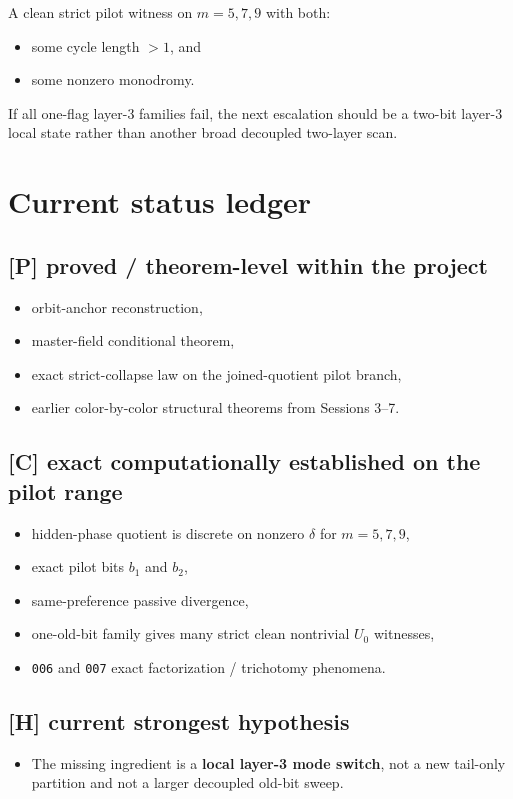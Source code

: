 \documentclass[11pt]{article}
\begin{document}
A clean strict pilot witness on $m=5,7,9$ with both:
\begin{itemize}
    \item some cycle length $>1$, and
    \item some nonzero monodromy.
\end{itemize}

If all one-flag layer-3 families fail, the next escalation should be a two-bit layer-3 local state rather than another broad decoupled two-layer scan.

\section*{Current status ledger}

\subsection*{[P] proved / theorem-level within the project}
\begin{itemize}
    \item orbit-anchor reconstruction,
    \item master-field conditional theorem,
    \item exact strict-collapse law on the joined-quotient pilot branch,
    \item earlier color-by-color structural theorems from Sessions 3--7.
\end{itemize}

\subsection*{[C] exact computationally established on the pilot range}
\begin{itemize}
    \item hidden-phase quotient is discrete on nonzero $\delta$ for $m=5,7,9$,
    \item exact pilot bits $b_1$ and $b_2$,
    \item same-preference passive divergence,
    \item one-old-bit family gives many strict clean nontrivial $U_0$ witnesses,
    \item \texttt{006} and \texttt{007} exact factorization / trichotomy phenomena.
\end{itemize}

\subsection*{[H] current strongest hypothesis}
\begin{itemize}
    \item The missing ingredient is a \textbf{local layer-3 mode switch}, not a new tail-only partition and not a larger decoupled old-bit sweep.
\end{itemize}
\end{document}
